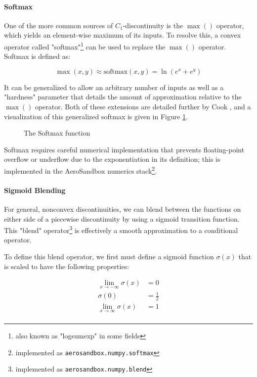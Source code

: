 \paragraph{Softmax}

One of the more common sources of $C_1$-discontinuity is the $\max()$ operator, which yields an element-wise maximum of its inputs. To resolve this, a convex operator called "softmax"\footnote{also known as "logsumexp" in some fields} can be used to replace the $\max()$ operator. Softmax is defined as:

\begin{equation}
    \max(x, y) \approx \text{softmax}(x, y) = \ln(e^x + e^y)
    \label{eq:softmax}
\end{equation}

It can be generalized to allow an arbitrary number of inputs as well as a "hardness" parameter that details the amount of approximation relative to the $\max()$ operator. Both of these extensions are detailed further by Cook \cite{cook-softmax}, and a visualization of this generalized softmax is given in Figure \ref{fig:softmax}.

\begin{figure}[H]
    \centering
    \ifdraft{}{}
    \caption{The Softmax function}
    \label{fig:softmax}
\end{figure}

Softmax requires careful numerical implementation that prevents floating-point overflow or underflow due to the exponentiation in its definition; this is implemented in the AeroSandbox numerics stack\footnote{implemented as \texttt{aerosandbox.numpy.softmax}}.

\paragraph{Sigmoid Blending}

For general, nonconvex discontinuities, we can blend between the functions on either side of a piecewise discontinuity by using a sigmoid transition function. This "blend" operator\footnote{implemented as \texttt{aerosandbox.numpy.blend}} is effectively a smooth approximation to a conditional operator.

To define this blend operator, we first must define a sigmoid function $\sigma(x)$ that is scaled to have the following properties:

\begin{equation*}
    \begin{aligned}
        \lim_{x \to -\infty}\sigma(x) &= 0 \\
        \sigma(0) &= \frac{1}{2} \\
        \lim_{x \to \infty}\sigma(x) &= 1 \\
    \end{aligned}
\end{equation*}

